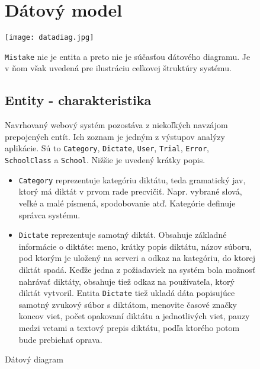 \documentclass[12pt,oneside]{fithesis2}
\begin{document}
	\begin{figure}
	\section{Dátový model}
	 	\texttt{[image: datadiag.jpg]}
	\label{datadiag}
	\caption{Dátový diagram}
	\bigskip
	\texttt{Mistake} nie je entita a preto nie je súčasťou dátového diagramu. Je v ňom však uvedená pre ilustráciu celkovej štruktúry systému.

	\subsection{Entity - charakteristika}

      \par Navrhovaný webový systém pozostáva z niekoľkých navzájom prepojených entít. Ich zoznam je jedným z výstupov analýzy aplikácie. Sú to \texttt{Category}, \texttt{Dictate}, \texttt{User}, \texttt{Trial}, \texttt{Error}, \texttt{SchoolClass} a \texttt{School}. Nižšie je uvedený krátky popis.
      \begin{itemize}
	\item \texttt{Category} reprezentuje kategóriu diktátu, teda gramatický jav, ktorý má diktát v prvom rade precvičiť. Napr. vybrané slová, veľké a malé písmená, spodobovanie atď. Kategórie definuje správca systému.
	\item \texttt{Dictate} reprezentuje samotný diktát. Obsahuje základné informácie o diktáte: meno, krátky popis diktátu, názov súboru, pod ktorým je uložený na serveri a odkaz na kategóriu, do ktorej diktát spadá. Keďže jedna z požiadaviek na systém bola možnosť nahrávať diktáty, obsahuje tiež odkaz na používateľa, ktorý diktát vytvoril. Entita \texttt{Dictate} tiež ukladá dáta popisujúce samotný zvukový súbor s diktátom, menovite časové značky koncov viet, počet opakovaní diktátu a jednotlivých viet, pauzy medzi vetami a textový prepis diktátu, podľa ktorého potom bude prebiehať oprava.
\end{itemize}	
\end{figure}
\end{document}
